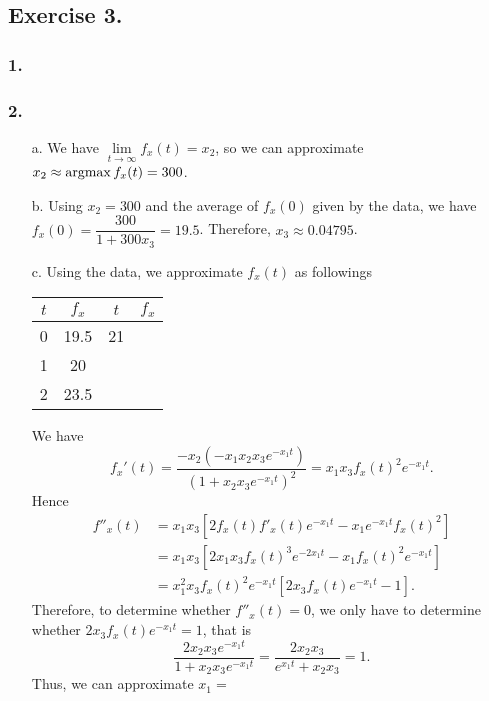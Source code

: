 \subsection*{Exercise 3.}

\subsubsection*{1.} 

\subsubsection*{2.}

\begin{enumerate}
  \item[a.] We have $\lim\limits_{t\to\infty} f_x(t) = x_2$, so we can approximate $x_2 \approx \operatorname*{argmax} f_x(t) = 300$.
  \item[b.] Using $x_2 = 300$ and the average of $f_x(0)$ given by the data, we have $f_x(0) = \dfrac{300}{1+300x_3} = 19.5$. Therefore, $x_3 \approx 0.04795$.
  \item[c.]
        Using the data, we approximate $f_x(t)$ as followings

        \begin{center}
          \begin{tabular}{|c|c|c|c|}
            \hline
            $t$ & $f_x$ & $t$ & $f_x$ \\
            \hline
            0   & 19.5  & 21  &       \\
            1   & 20    &     &       \\
            2   & 23.5  &     &       \\
          \end{tabular}
        \end{center}


        We have
        $$f_x'(t) = \dfrac{-x_2(-x_1x_2x_3e^{-x_1t})}{(1+x_2x_3e^{-x_1t})^2} = x_1x_3f_x(t)^2e^{-x_1t}.$$
        Hence
        \begin{align*}
          f''_x(t)
           & = x_1x_3\left[2f_x(t)f'_x(t)e^{-x_1t}-x_1e^{-x_1t}f_x(t)^2\right]   \\
           & = x_1x_3\left[2x_1x_3f_x(t)^3e^{-2x_1t}-x_1f_x(t)^2e^{-x_1t}\right] \\
           & = x_1^2x_3f_x(t)^2e^{-x_1t}\left[2x_3f_x(t)e^{-x_1t}-1\right].
        \end{align*}
        Therefore, to determine whether $f''_x(t)=0$, we only have to determine whether $2x_3f_x(t)e^{-x_1t}=1$, that is
        $$\dfrac{2x_2x_3 e^{-x_1t}}{1+x_2x_3e^{-x_1t}} = \dfrac{2x_2x_3}{e^{x_1t}+x_2x_3} = 1.$$
        Thus, we can approximate $x_1=$
\end{enumerate}
